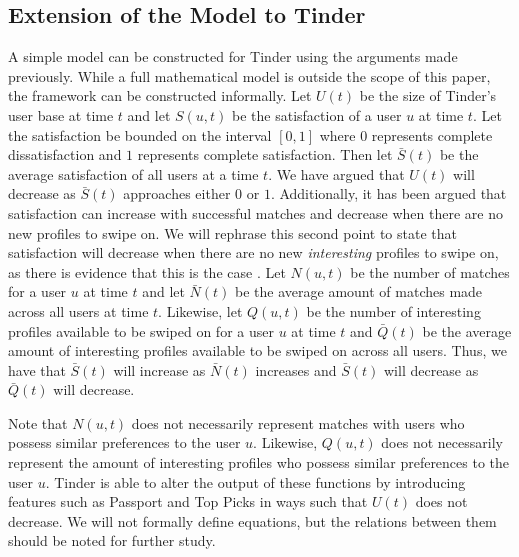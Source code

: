 \subsection{Extension of the Model to Tinder}

A simple model can be constructed for Tinder using the arguments made previously. While a full mathematical model is outside the scope of this paper, the framework can be constructed informally. Let $U(t)$ be the size of Tinder's user base at time $t$ and let $S(u, t)$ be the satisfaction of a user $u$ at time $t$. Let the satisfaction be bounded on the interval $[0, 1]$ where $0$ represents complete dissatisfaction and $1$ represents complete satisfaction. Then let $\bar{S}(t)$ be the average satisfaction of all users at a time $t$. We have argued that $U(t)$ will decrease as $\bar{S}(t)$ approaches either $0$ or $1$. Additionally, it has been argued that satisfaction can increase with successful matches and decrease when there are no new profiles to swipe on. We will rephrase this second point to state that satisfaction will decrease when there are no new \textit{interesting} profiles to swipe on, as there is evidence that this is the case \citep{Tiffany2019}. Let $N(u, t)$ be the number of matches for a user $u$ at time $t$ and let $\bar{N}(t)$ be the average amount of matches made across all users at time $t$. Likewise, let $Q(u, t)$ be the number of interesting profiles available to be swiped on for a user $u$ at time $t$ and $\bar{Q}(t)$ be the average amount of interesting profiles available to be swiped on across all users. Thus, we have that $\bar{S}(t)$ will increase as $\bar{N}(t)$ increases and $\bar{S}(t)$ will decrease as $\bar{Q}(t)$ will decrease.

Note that $N(u,t)$ does not necessarily represent matches with users who possess similar preferences to the user $u$. Likewise, $Q(u,t)$ does not necessarily represent the amount of interesting profiles who possess similar preferences to the user $u$. Tinder is able to alter the output of these functions by introducing features such as Passport and Top Picks in ways such that $U(t)$ does not decrease. We will not formally define equations, but the relations between them should be noted for further study.